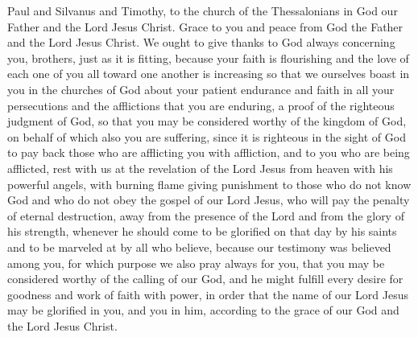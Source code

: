 
\begin{biblechapter} %
 Paul and Silvanus and Timothy, to the church of the Thessalonians in God our Father and the Lord Jesus Christ.
\verse Grace to you and peace from God the Father and the Lord Jesus Christ.
 We ought to give thanks to God always concerning you, brothers, just as it is fitting, because your faith is flourishing and the love of each one of you all toward one another is increasing
\verse so that we ourselves boast in you in the churches of God about your patient endurance and faith in all your persecutions and the afflictions that you are enduring,
\verse a proof of the righteous judgment of God, so that you may be considered worthy of the kingdom of God, on behalf of which also you are suffering,
\verse since it is righteous in the sight of God to pay back those who are afflicting you with affliction,
\verse and to you who are being afflicted, rest with us at the revelation of the Lord Jesus from heaven with his powerful angels,
\verse with burning flame giving punishment to those who do not know God and who do not obey the gospel of our Lord Jesus,
\verse who will pay the penalty of eternal destruction, away from the presence of the Lord and from the glory of his strength,
\verse whenever he should come to be glorified on that day by his saints and to be marveled at by all who believe, because our testimony was believed among you,
\verse for which purpose we also pray always for you, that you may be considered worthy of the calling of our God, and he might fulfill every desire for goodness and work of faith with power,
\verse in order that the name of our Lord Jesus may be glorified in you, and you in him, according to the grace of our God and the Lord Jesus Christ.
\end{biblechapter}

